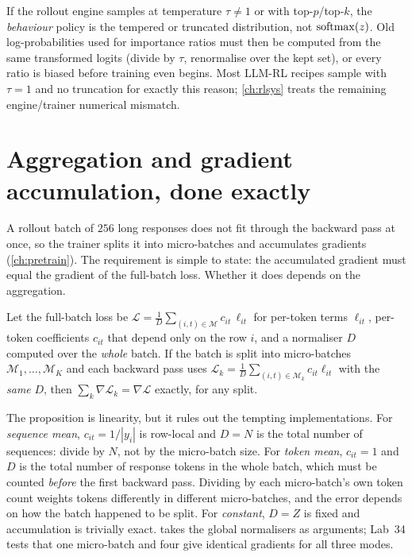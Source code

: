 \begin{pitfall}
If the rollout engine samples at temperature $\tau\neq1$ or with top-$p$/top-$k$, the
\emph{behaviour} policy is the tempered or truncated distribution, not $\operatorname{softmax}(z)$. Old
log-probabilities used for importance ratios must then be computed from the same
transformed logits (divide by $\tau$, renormalise over the kept set), or every ratio is
biased before training even begins. Most LLM-RL recipes sample with $\tau=1$ and no
truncation for exactly this reason; \cref{ch:rlsys} treats the remaining engine/trainer
numerical mismatch.
\end{pitfall}

\section{Aggregation and gradient accumulation, done exactly}\label{sec:pg:aggregation}

A rollout batch of $256$ long responses does not fit through the backward pass at once, so the
trainer splits it into micro-batches and accumulates gradients (\cref{ch:pretrain}). The
requirement is simple to state: the accumulated gradient must equal the gradient of the
full-batch loss. Whether it does depends on the aggregation.

\begin{proposition}\label{prop:pg:accum}
Let the full-batch loss be $\mathcal{L}=\frac{1}{D}\sum_{(i,t)\in\mathcal{M}}c_{it}\,\ell_{it}$
for per-token terms $\ell_{it}$, per-token coefficients $c_{it}$ that depend only on the row
$i$, and a normaliser $D$ computed over the \emph{whole} batch. If the batch is split into
micro-batches $\mathcal{M}_1,\dots,\mathcal{M}_K$ and each backward pass uses
$\mathcal{L}_k=\frac{1}{D}\sum_{(i,t)\in\mathcal{M}_k}c_{it}\ell_{it}$ with the \emph{same}
$D$, then $\sum_k\nabla\mathcal{L}_k=\nabla\mathcal{L}$ exactly, for any split.
\end{proposition}
The proposition is linearity, but it rules out the tempting implementations. For
\emph{sequence mean}, $c_{it}=1/|y_i|$ is row-local and $D=N$ is the total number of
sequences: divide by $N$, not by the micro-batch size. For \emph{token mean},
$c_{it}=1$ and $D$ is the total number of response tokens in the whole batch, which must
be counted \emph{before} the first backward pass. Dividing by each micro-batch's own token
count weights tokens differently in different micro-batches, and the error depends on how
the batch happened to be split. For \emph{constant}, $D=Z$ is fixed and accumulation is
trivially exact.  takes the global normalisers as arguments; Lab~34
tests that one micro-batch and four give identical gradients for all three modes.

